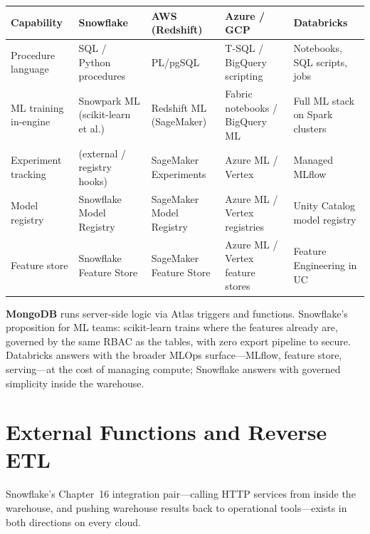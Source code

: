 \begin{center}
\footnotesize
\begin{tabular}{@{}p{2.5cm}p{2.9cm}p{2.7cm}p{2.9cm}p{2.9cm}@{}}
\toprule
\textbf{Capability} & \textbf{Snowflake} & \textbf{AWS (Redshift)} & \textbf{Azure / GCP} & \textbf{Databricks} \\
\midrule
Procedure language & SQL / Python procedures & PL/pgSQL & T-SQL / BigQuery scripting & Notebooks, SQL scripts, jobs \\
ML training in-engine & Snowpark ML (scikit-learn et al.) & Redshift ML (SageMaker) & Fabric notebooks / BigQuery ML & Full ML stack on Spark clusters \\
Experiment tracking & (external / registry hooks) & SageMaker Experiments & Azure ML / Vertex & Managed MLflow \\
Model registry & Snowflake Model Registry & SageMaker Model Registry & Azure ML / Vertex registries & Unity Catalog model registry \\
Feature store & Snowflake Feature Store & SageMaker Feature Store & Azure ML / Vertex feature stores & Feature Engineering in UC \\
\bottomrule
\end{tabular}
\end{center}

\noindent \textbf{MongoDB} runs server-side logic via Atlas triggers and functions. Snowflake's
proposition for ML teams: scikit-learn trains where the features already are, governed by the
same RBAC as the tables, with zero export pipeline to secure. Databricks answers with the
broader MLOps surface---MLflow, feature store, serving---at the cost of managing compute;
Snowflake answers with governed simplicity inside the warehouse.

\section{External Functions and Reverse ETL}
%
Snowflake's Chapter~16 integration pair---calling HTTP services from inside the warehouse, and
pushing warehouse results back to operational tools---exists in both directions on every cloud.

